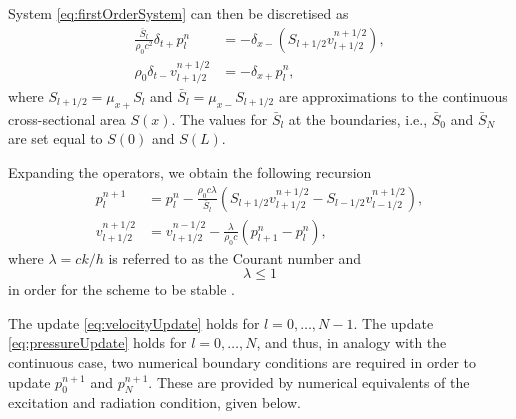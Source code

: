 System \eqref{eq:firstOrderSystem} can then be discretised as
\begin{subequations}\label{eq:FDS}
    \begin{align}
        \frac{\bar S_l}{\rho_0 c^2}\delta_{t+}p_l^n &= -\delta_{x-}(S_{l+1/2}v_{l+1/2}^{n+1/2}),\label{eq:discPressure}\\
        \rho_0 \delta_{t-}v_{l+1/2}^{n+1/2}&=-\delta_{x+}p_l^n,\label{eq:discVelocity}
    \end{align}
\end{subequations}
where $S_{l+1/2} = \mu_{x+}S_l$ and $\bar S_l = \mu_{x-}S_{l+1/2}$ are approximations to the continuous cross-sectional area $S(x)$. The values for $\bar S_l$ at the boundaries, i.e., $\bar S_0$ and $\bar S_N$ are set equal to $S(0)$ and $S(L)$.

Expanding the operators, we obtain the following recursion
\begin{subequations}\label{eq:updateNormal}
    \begin{align}
        p_l^{n+1} &= p_l^n - \frac{\rho_0 c \lambda}{\bar{S}_l}(S_{l+1/2}v_{l+1/2}^{n+1/2}-S_{l-1/2}v_{l-1/2}^{n+1/2}),\label{eq:pressureUpdate}\\
        v_{l+1/2}^{n+1/2} &= v_{l+1/2}^{n-1/2}-\frac{\lambda}{\rho_0 c}(p_{l+1}^n - p_l^n),\label{eq:velocityUpdate}
    \end{align}
\end{subequations}
where $\lambda = ck/h$ is referred to as the Courant number and
\begin{equation}\label{eq:CFL}
    \lambda \leq 1
\end{equation}
in order for the scheme to be stable \cite{}. 

The update \eqref{eq:velocityUpdate} holds for $l=0,\hdots,N-1$. The update \eqref{eq:pressureUpdate} holds for $l=0,\hdots,N$, and thus, in analogy with the continuous case, two numerical boundary conditions are required in order to update $p_{0}^{n+1}$ and $p_{N}^{n+1}$. These are provided by numerical equivalents of the excitation and radiation condition, given below. 

